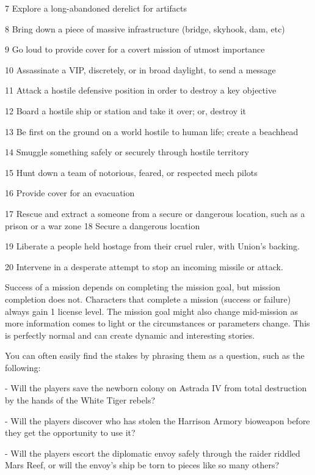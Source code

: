  7         Explore a long-abandoned derelict for artifacts

 8         Bring down a piece of massive infrastructure (bridge, skyhook, dam, etc)

 9         Go loud to provide cover for a covert mission of utmost importance

  10       Assassinate a VIP, discretely, or in broad daylight, to send a message

  11       Attack a hostile defensive position in order to destroy a key objective

  12       Board a hostile ship or station and take it over; or, destroy it

  13       Be first on the ground on a world hostile to human life; create a beachhead

  14       Smuggle something safely or securely through hostile territory

  15       Hunt down a team of notorious, feared, or respected mech pilots

  16       Provide cover for an evacuation

  17       Rescue and extract a someone from a secure or dangerous location, such as a prison
           or a war zone
  18       Secure a dangerous location

  19       Liberate a people held hostage from their cruel ruler, with Union’s backing.

  20       Intervene in a desperate attempt to stop an incoming missile or attack.

Success of a mission depends on completing the mission goal, but mission completion does
not. Characters that complete a mission (success or failure) always gain 1 license level. The
mission goal might also change mid-mission as more information comes to light or the
circumstances or parameters change. This is perfectly normal and can create dynamic and
interesting stories.





You can often easily find the stakes by phrasing them as a question, such as the following:

     -   Will the players save the newborn colony on Astrada IV from total destruction by the
         hands of the White Tiger rebels?

     -   Will the players discover who has stolen the Harrison Armory bioweapon before they get
         the opportunity to use it?

     -   Will the players escort the diplomatic envoy safely through the raider riddled Mars Reef,
         or will the envoy’s ship be torn to pieces like so many others?

